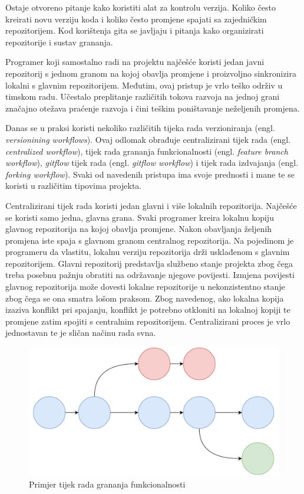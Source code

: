 \documentclass[times, utf8, diplomski, numeric]{fer}
\newcommand{\eng}[1]{(engl. \textit{#1})}
\begin{document}
Ostaje otvoreno pitanje kako koristiti alat za kontrolu verzija. Koliko često kreirati novu verziju koda i koliko često promjene spajati sa zajedničkim repozitorijem. Kod korištenja gita se javljaju i pitanja kako organizirati repozitorije i sustav grananja.

Programer koji samostalno radi na projektu najčešće koristi jedan javni repozitorij s jednom granom na kojoj obavlja promjene i proizvoljno sinkronizira lokalni s glavnim repozitorijem. Međutim, ovaj pristup je vrlo teško održiv u timskom radu. Učestalo preplitanje različitih tokova razvoja na jednoj grani značajno otežava praćenje razvoja i čini teškim poništavanje neželjenih promjena.

Danas se u praksi koristi nekoliko različitih tijeka rada verzioniranja \eng{versionining workflows}. Ovaj odlomak obrađuje centralizirani tijek rada \eng{centralized workflow}, tijek rada grananja funkcionalnosti \eng{feature branch workflow}, \textit{gitflow} tijek rada \eng{gitflow workflow} i tijek rada izdvajanja \eng{forking workflow}. Svaki od navedenih pristupa ima svoje prednosti i mane te se koristi u različitim tipovima projekta\citep{versioningWorkflows}.

Centralizirani tijek rada koristi jedan glavni i više lokalnih repozitorija. Najčešće se koristi samo jedna, glavna grana. Svaki programer kreira lokalnu kopiju glavnog repozitorija na kojoj obavlja promjene. Nakon obavljanja željenih promjena iste spaja s glavnom granom centralnog repozitorija. Na pojedinom je programeru da vlastitu, lokalnu verziju repozitorija drži usklađenom s glavnim repozitorijem. Glavni repozitorij predstavlja službeno stanje projekta zbog čega treba posebnu pažnju obratiti na održavanje njegove povijesti. Izmjena povijesti glavnog repozitorija može dovesti lokalne repozitorije u nekonzistentno stanje zbog čega se ona smatra lošom praksom. Zbog navedenog, ako lokalna kopija izaziva konflikt pri spajanju, konflikt je potrebno otkloniti na lokalnoj kopiji te promjene zatim spojiti s centralnim repozitorijem. Centralizirani proces je vrlo jednostavan te je sličan načinu rada svna.

\begin{figure}
\centering
\includegraphics[scale=0.5]{FeatureBranch}
\caption{Primjer tijek rada grananja funkcionalnosti}
\label{fig:FeatureBranch}
\end{figure}
\end{document}
